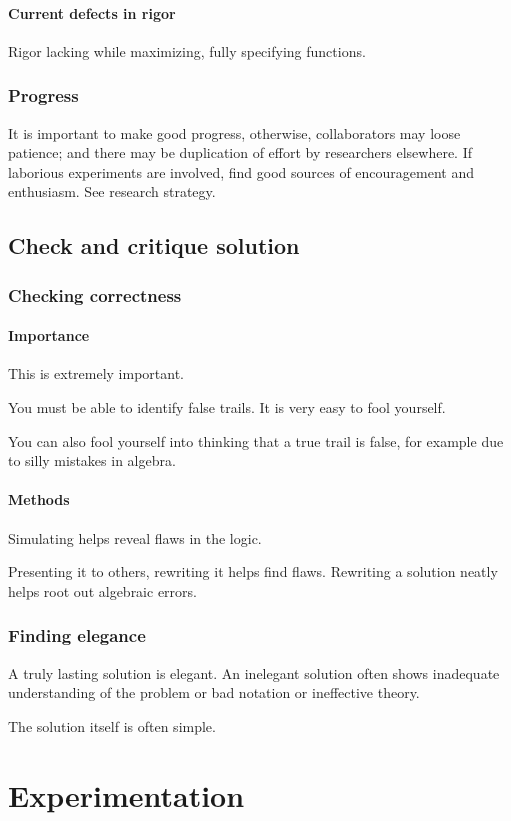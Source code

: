 \documentclass[oneside, article]{memoir}
\begin{document}
\subsubsection{Current defects in rigor}
Rigor lacking while maximizing, fully specifying functions.

\subsection{Progress}
It is important to make good progress, otherwise, collaborators may loose patience; and there may be duplication of effort by researchers elsewhere. If laborious experiments are involved, find good sources of encouragement and enthusiasm. See research strategy.


\section{Check and critique solution}
\subsection{Checking correctness}
\subsubsection{Importance}
This is extremely important.

You must be able to identify false trails. It is very easy to fool yourself.

You can also fool yourself into thinking that a true trail is false, for example due to silly mistakes in algebra.

\subsubsection{Methods}
Simulating helps reveal flaws in the logic.

Presenting it to others, rewriting it helps find flaws. Rewriting a solution neatly helps root out algebraic errors.

\subsection{Finding elegance}
A truly lasting solution is elegant. An inelegant solution often shows inadequate understanding of the problem or bad notation or ineffective theory.

The solution itself is often simple.

\chapter{Experimentation}
\end{document}
